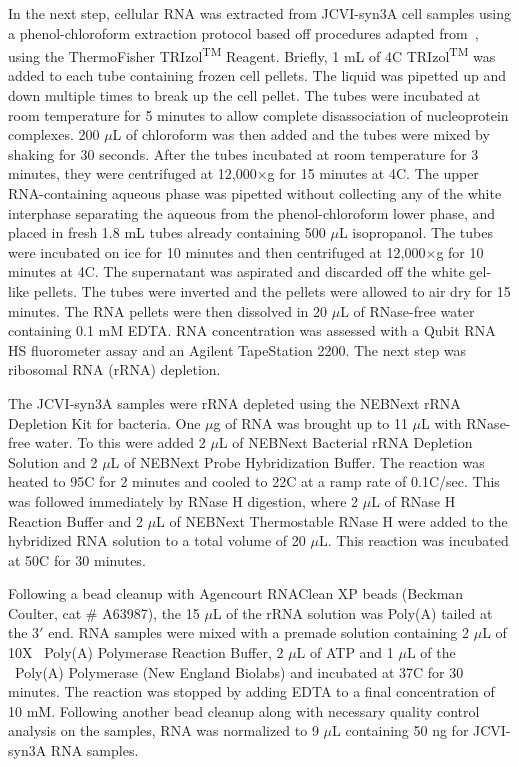 In the next step, cellular RNA was extracted from JCVI-syn3A cell samples using a phenol-chloroform extraction protocol based off procedures adapted from~\cite{grunberger_next_2019}, using the ThermoFisher TRIzol\textsuperscript{TM} Reagent.
Briefly, 1 mL of 4\textdegree C TRIzol\textsuperscript{TM} was added to each tube containing frozen cell pellets.
The liquid was pipetted up and down multiple times to break up the cell pellet.
The tubes were incubated at room temperature for 5 minutes to allow complete disassociation of nucleoprotein complexes.
200 $\mu$L of chloroform was then added and the tubes were mixed by shaking for 30 seconds.
After the tubes incubated at room temperature for 3 minutes, they were centrifuged at 12,000$\times$g for 15 minutes at 4\textdegree C.
The upper RNA-containing aqueous phase was pipetted without collecting any of the white interphase separating the aqueous from the phenol-chloroform lower phase, and placed in fresh 1.8 mL tubes already containing 500 $\mu$L isopropanol.
The tubes were incubated on ice for 10 minutes and then centrifuged at 12,000$\times$g for 10 minutes at 4\textdegree C.
The supernatant was aspirated and discarded off the white gel-like pellets.
The tubes were inverted and the pellets were allowed to air dry for 15 minutes.
The RNA pellets were then dissolved in 20 $\mu$L of RNase-free water containing 0.1 mM EDTA.
RNA concentration was assessed with a Qubit RNA HS fluorometer assay and an Agilent TapeStation 2200.
The next step was ribosomal RNA (rRNA) depletion.

The JCVI-syn3A samples were rRNA depleted using the NEBNext\textregistered{} rRNA Depletion Kit for bacteria.
One $\mu$g of RNA was brought up to 11 $\mu$L with RNase-free water.
To this were added 2 $\mu$L of NEBNext\textregistered{} Bacterial rRNA Depletion Solution and 2 $\mu$L of NEBNext\textregistered{} Probe Hybridization Buffer.
The reaction was heated to 95\textdegree C for 2 minutes and cooled to 22\textdegree C at a ramp rate of 0.1\textdegree C/sec.
This was followed immediately by RNase H digestion, where 2 $\mu$L of RNase H Reaction Buffer and 2 $\mu$L of NEBNext Thermostable RNase H were added to the hybridized RNA solution to a total volume of 20 $\mu$L.
This reaction was incubated at 50\textdegree C for 30 minutes.

Following a bead cleanup with Agencourt RNAClean XP beads (Beckman Coulter\texttrademark, cat \# A63987), the 15 $\mu$L of the rRNA solution was Poly(A) tailed at the 3$'$ end.
RNA samples were mixed with a premade solution containing 2 $\mu$L of 10X \eco~Poly(A) Polymerase Reaction Buffer, 2 $\mu$L of ATP and 1 $\mu$L of the \eco~Poly(A) Polymerase (New England Biolabs) and incubated at 37\textdegree C for 30 minutes.
The reaction was stopped by adding EDTA to a final concentration of 10 mM.
Following another bead cleanup along with necessary quality control analysis on the samples, RNA was normalized to 9 $\mu$L containing 50 ng for JCVI-syn3A RNA samples.

